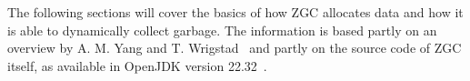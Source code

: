 
The following sections will cover the basics of how ZGC allocates data and how it is able to dynamically collect garbage. The information is based partly on an overview by A. M. Yang and T. Wrigstad~\cite{zgc:deep_dive} and partly on the source code of ZGC itself, as available in OpenJDK version 22.32~\cite{jdk:tag2232}.

